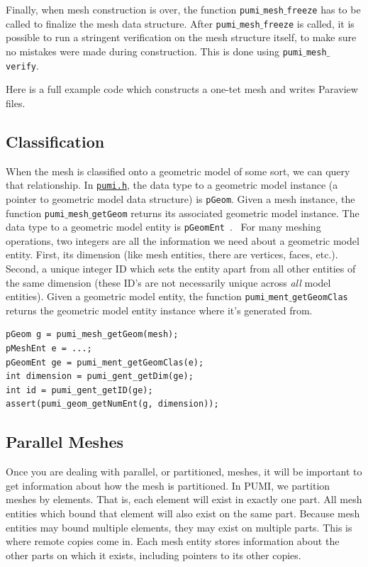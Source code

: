 \documentclass{article}
\begin{document}
Finally, when mesh construction is over, the function
\texttt{pumi$\_$mesh$\_$freeze} has to be called to finalize the mesh data
structure.
After \texttt{pumi$\_$mesh$\_$freeze} is called, it is possible to run
a stringent verification on the mesh structure itself,
to make sure no mistakes were made during construction.
This is done using \texttt{pumi$\_$mesh$\_$verify}.

Here is a full example code which constructs a one-tet
mesh and writes Paraview files.



\subsection{Classification}

When the mesh is classified onto a geometric model of some sort, we
can query that relationship.
In \href{https://github.com/SCOREC/core/blob/master/pumi/pumi.h}
{\texttt{pumi.h}}, the data type to a geometric model instance (a pointer to
geometric model data structure) is \texttt{pGeom}.
Given a mesh instance, the function \texttt{pumi$\_$mesh$\_$getGeom} returns
its associated geometric model instance.
The data type to a geometric model entity is {\texttt{pGeomEnt}}~.
\
For many meshing operations, two integers are all the information
we need about a geometric model entity.
First, its dimension (like mesh entities, there are vertices, faces, etc.).
Second, a unique integer ID which sets the entity apart from
all other entities of the same dimension (these ID's are not necessarily
unique across \emph{all} model entities).
Given a geometric model entity, the function
\texttt{pumi$\_$ment$\_$getGeomClas} returns the geometric model entity
instance where it's generated from.

\begin{lstlisting}
pGeom g = pumi_mesh_getGeom(mesh);
pMeshEnt e = ...;
pGeomEnt ge = pumi_ment_getGeomClas(e);
int dimension = pumi_gent_getDim(ge);
int id = pumi_gent_getID(ge);
assert(pumi_geom_getNumEnt(g, dimension));
\end{lstlisting}

\subsection{Parallel Meshes}

Once you are dealing with parallel, or partitioned, meshes,
it will be important to get information about how the
mesh is partitioned.
In PUMI, we partition meshes by elements.
That is, each element will exist in exactly one part.
All mesh entities which bound that element will also exist on
the same part.
Because mesh entities may bound multiple elements, they may
exist on multiple parts.
This is where remote copies come in.
Each mesh entity stores information about the other parts
on which it exists, including pointers to its other copies.
\end{document}
